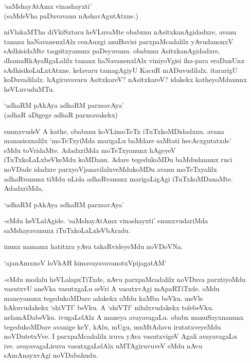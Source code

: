 \begin{shloka}
`saMshayAtAmx vinashayxti'\\
(saMdeVha paDuvavanu nAshavAgutAtxne.)
\end{shloka}

niVlakaMTha diVkiSxtaru heVLuvaMte obabxnu nAsitxkanAgidadxre, avanu tananx haNavanenxlAlx cenAnxgi anuBavisi parxpaMcadalilx yAvudanonxV sAdhisidaMte taqpitxyanunx paDeyuvanu. obabxnu AsitxkanAgidadxre, dhamaRkAyaRgaLalilx tananx haNavanenxlAlx viniyoVgisi iha-para eraDanUnx sAdhisikoLuLxtAtxne. kelavaru tamagAgiyU KacuR mADuvudilalx. itararigU koDuvadilalx. hAgiruvavaru AsitxkareV? nAsitxkareV? idakekx katheyoMdanunx heVLuvuduMTu.

\begin{shloka}
`adhaRM pAkAya adhaRM parxsavAya'\\
(adhaR aDigege adhaR parxsavakekx)
\end{shloka}

enunxvudeV A kathe, obabxnu koVLimoTeTx iTuTxkoMDidadxnu. avana manasisxnalilx `moTeTxyiMda marigaLu baMdare saMtati hecAcxgutatxde' eMdu toVridaMte. AdadxriMda moTeTxyanunx hAgeyeV iTuTxkoLaLxbeVkeMdu koMDanu. Adare tegedukoMDu baMdudanunx ruci noVDade idadxre parxyoVjanavilalxveMdukoMDu avanu moTeTxyalilx adhaRvanunx tiMdu uLida adhaRvanunx marigaLigAgi iTuTxkoMDanaMte. AdadxriMda,

\begin{shloka}
`adhaRM pAkAya adhaRM parxsavAya'
\end{shloka}

-eMdu heVLalAgide. `saMshayAtAmx vinashayxti' enunxvudariMda saMshayavanunx iTuTxkoLaLxleVbAradu.

inunx namamx hatitxra yAva takaRvideyeMdu noVDoVNa.

\begin{shloka}
`ajanAmxnoV loVkAH kimavayavavanotxVpi\s jagatAM'
\end{shloka}

-eMdu modalu heVLalapxTiTxde, nAvu parxpaMcadalilx noVDuva parxtiyoMdu vasutxvU aneVka vasutxgaLu seVri A vasutxvAgi mApaRTiTxde. oMdu maneyanunx tegedukoMDare adakekx oMdu kaMba beVku. meVle hAkuvudakekx `shiVTf' beVku. A `shiVTf' nilulxvudakekx tolebeVku. nelamADabeVku. ivugaLelAlx A maneya avayavagaLu. obabx manuSayxnanunx tegedukoMDare avanige keY, kAlu, mUgu, muMtAdavu irutatxveyeMdu noVDutetxVve. I parxpaMcadalilx iruva yAva vasutxvigeV Agali avayavagaLu ive. avayavagaLiruva vasutxgaLelAlx uMTAgiruvuveV eMdu nAvu sAmAnayxvAgi noVDabahudu.


